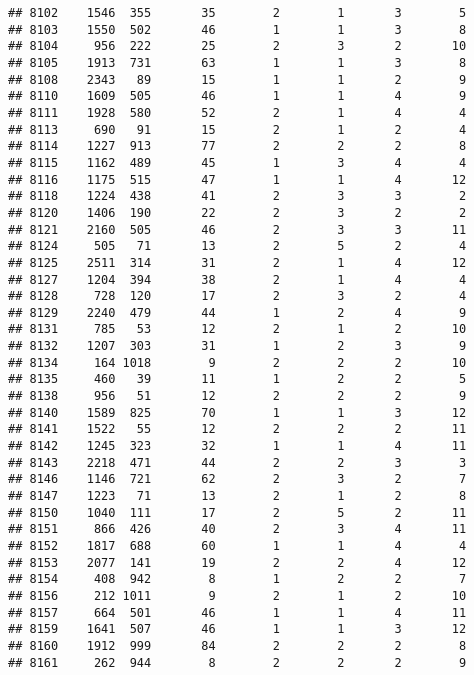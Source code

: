 \documentclass[]{article}
\begin{document}
\begin{verbatim}
## 8102    1546  355       35        2        1       3        5
## 8103    1550  502       46        1        1       3        8
## 8104     956  222       25        2        3       2       10
## 8105    1913  731       63        1        1       3        8
## 8108    2343   89       15        1        1       2        9
## 8110    1609  505       46        1        1       4        9
## 8111    1928  580       52        2        1       4        4
## 8113     690   91       15        2        1       2        4
## 8114    1227  913       77        2        2       2        8
## 8115    1162  489       45        1        3       4        4
## 8116    1175  515       47        1        1       4       12
## 8118    1224  438       41        2        3       3        2
## 8120    1406  190       22        2        3       2        2
## 8121    2160  505       46        2        3       3       11
## 8124     505   71       13        2        5       2        4
## 8125    2511  314       31        2        1       4       12
## 8127    1204  394       38        2        1       4        4
## 8128     728  120       17        2        3       2        4
## 8129    2240  479       44        1        2       4        9
## 8131     785   53       12        2        1       2       10
## 8132    1207  303       31        1        2       3        9
## 8134     164 1018        9        2        2       2       10
## 8135     460   39       11        1        2       2        5
## 8138     956   51       12        2        2       2        9
## 8140    1589  825       70        1        1       3       12
## 8141    1522   55       12        2        2       2       11
## 8142    1245  323       32        1        1       4       11
## 8143    2218  471       44        2        2       3        3
## 8146    1146  721       62        2        3       2        7
## 8147    1223   71       13        2        1       2        8
## 8150    1040  111       17        2        5       2       11
## 8151     866  426       40        2        3       4       11
## 8152    1817  688       60        1        1       4        4
## 8153    2077  141       19        2        2       4       12
## 8154     408  942        8        1        2       2        7
## 8156     212 1011        9        2        1       2       10
## 8157     664  501       46        1        1       4       11
## 8159    1641  507       46        1        1       3       12
## 8160    1912  999       84        2        2       2        8
## 8161     262  944        8        2        2       2        9

\end{verbatim}
\end{document}
